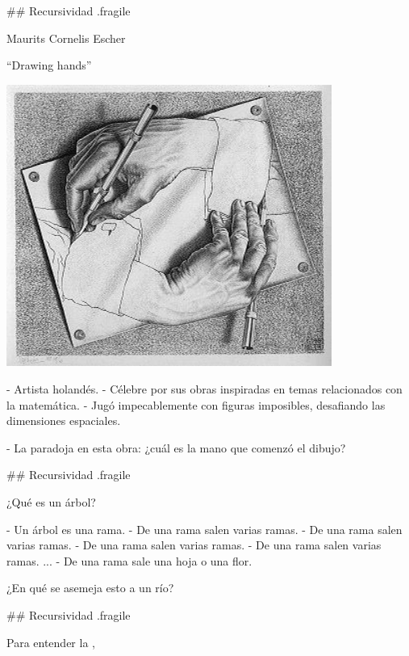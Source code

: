 ## Recursividad {.fragile}

\bgncolumns


\vspace{-1em}

\bgnblockgood[wd=.8\textwidth,centered]
Maurits Cornelis Escher
\trmblockgood

\centering ``Drawing hands''

\includegraphics[width=0.8\textwidth,valign=t]{img/DrawingHands.jpg}
\trmcolumns

- Artista holandés.
- Célebre por sus obras inspiradas en temas relacionados con la matemática.
- Jugó impecablemente con figuras imposibles, desafiando las dimensiones espaciales.

- La paradoja en esta obra: ¿cuál es la mano que comenzó el dibujo?

## Recursividad {.fragile}


¿Qué es un árbol?

- Un árbol es una rama.
- De una rama salen varias ramas.
- De una rama salen varias ramas.
- De una rama salen varias ramas.
- De una rama salen varias ramas.
...
- De una rama sale una hoja o una flor.

\bgnblocknormal
¿En qué se asemeja esto a un río?
\trmblocknormal

## Recursividad {.fragile}


\pause

\bgnblockdefinition
Para entender la ,

